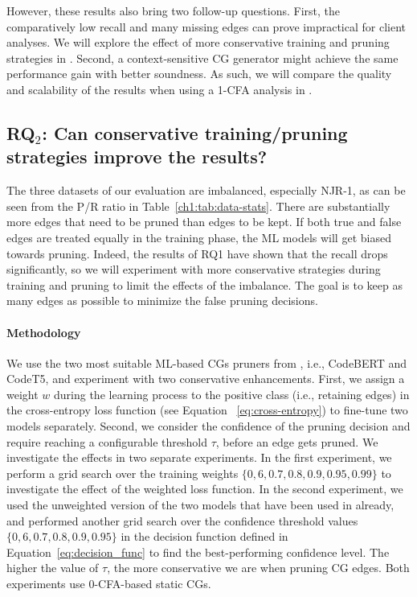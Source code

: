 However, these results also bring two follow-up questions.
First, the comparatively low recall and many missing edges can prove impractical for client analyses.
We will explore the effect of more conservative training and pruning strategies in .
Second, a context-sensitive CG generator might achieve the same performance gain with better soundness.
As such, we will compare the quality and scalability of the results when using a 1-CFA analysis in .

\subsection{\textbf{RQ}$_{2}$: Can conservative training/pruning strategies improve the results?}

The three datasets of our evaluation are imbalanced, especially NJR-1, as can be seen from the P/R ratio in Table~\ref{ch1:tab:data-stats}. There are substantially more edges that need to be pruned than edges to be kept.
If both true and false edges are treated equally in the training phase, the ML models will get biased towards pruning.
Indeed, the results of RQ1 have shown that the recall drops significantly, so we will experiment with more conservative strategies during training and pruning to limit the effects of the imbalance.
The goal is to keep as many edges as possible to minimize the false pruning decisions.

\paragraph{Methodology} We use the two most suitable ML-based CGs pruners from , i.e., CodeBERT and CodeT5, and experiment with two conservative enhancements.
First, we assign a weight $w$ during the learning process to the positive class (i.e., retaining edges) in the cross-entropy loss function (see Equation ~\ref{eq:cross-entropy}) to fine-tune two models separately.
Second, we consider the confidence of the pruning decision and require reaching a configurable threshold $\tau$, before an edge gets pruned.
We investigate the effects in two separate experiments.
In the first experiment, we perform a grid search over the training weights $\{0,6, 0.7, 0.8, 0.9, 0.95, 0.99\}$ to investigate the effect of the weighted loss function.
In the second experiment, we used the unweighted version of the two models that have been used in  already, and performed another grid search over the confidence threshold values $\{0,6, 0.7, 0.8, 0.9, 0.95\}$ in the decision function defined in Equation~\ref{eq:decision_func} to find the best-performing confidence level.
The higher the value of $\tau$, the more conservative we are when pruning CG edges.
Both experiments use 0-CFA-based static CGs.


